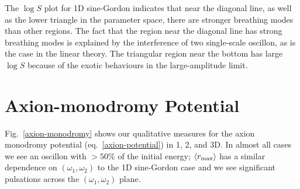 \documentclass{report}
\begin{document}
The $\log S$ plot for 1D sine-Gordon indicates that near the diagonal line, as well as the lower triangle in the parameter space, there are stronger breathing modes than other regions. The fact that the region near the diagonal line has strong breathing modes is explained by the interference of two single-scale oscillon, as is the case in the linear theory. The triangular region near the bottom has large $\log S$ because of the exotic behaviours in the large-amplitude limit.

\section{Axion-monodromy Potential}
Fig.~\ref{axion-monodromy} shows our qualitative measures for the axion monodromy potential (eq.~\ref{axion-potential}) in 1, 2, and 3D. In almost all cases we see an oscillon with $>50\%$ of the initial energy; $\langle r_{\rm max}\rangle$ has a similar dependence on $(\omega_1,\omega_2)$ to the 1D sine-Gordon case and we see significant pulsations across the $(\omega_1,\omega_2)$ plane.
\end{document}
